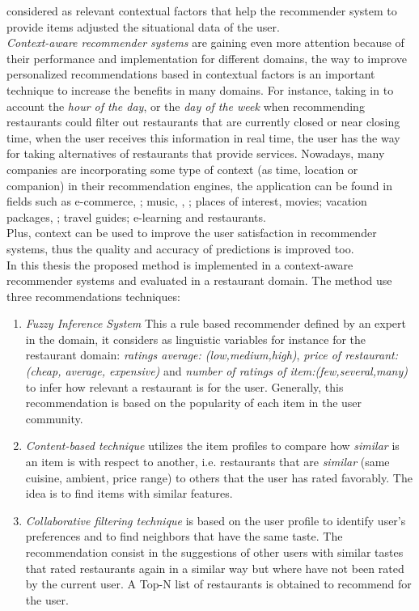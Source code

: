 considered as relevant contextual factors that help the recommender
system to provide items adjusted the situational data of the user.\\
\textit{Context-aware recommender systems} are gaining even more
attention because of their performance and implementation for
different domains, the  way to improve personalized recommendations
based in contextual factors is an important technique to increase the
benefits in  many domains. For instance, taking in to account the
\textit{hour of the day},  or the \textit{day of the week} when
recommending restaurants could  filter out restaurants that are
currently closed or near closing time, when the user receives this
information in real time, the user has the  way for taking
alternatives of restaurants that provide services. Nowadays, many
companies are incorporating some type of context (as time, location or
companion) in their recommendation engines,  the application can be
found in fields such as e-commerce\cite{schafer1999recommender},
\cite{bulander2005enabling}; music\cite{ricci2012context}, 
\cite{baltrunas2011incarmusic}, \cite{huq2010automated}; 
places of interest\cite{baltrunas2012context},
movies\cite{eyjolfsdottir2010moviegen}; vacation
packages\cite{liu2011personalized}, \cite{liu2014cocktail}; 
travel guides\cite{savage2012m}; e-learning\cite{ortigosa2010entornos} 
and restaurants\cite{chu2013chinese}.\\
Plus, context can be used to improve the user satisfaction  in
recommender systems, thus the quality and accuracy of predictions  
is improved too.\\
In this thesis the proposed method is implemented in a context-aware 
recommender systems and evaluated in a restaurant domain. The method 
use three recommendations techniques:
\begin{enumerate} 
\item \textit{Fuzzy Inference System} This a rule based recommender
defined by an expert in the domain, it considers as linguistic
variables for instance for the restaurant domain: \textit{ratings
average: (low,medium,high)}, \textit{price of restaurant:(cheap,
average, expensive)} and \textit{number of ratings of
item:(few,several,many)} to infer how relevant a restaurant is for the
user. Generally, this recommendation is based on the popularity of
each item in the user community.
\item \textit{Content-based technique} utilizes the item profiles 
to compare how \textit{similar} is an item is with respect to 
another, i.e. restaurants that are \textit{similar} (same cuisine, 
ambient, price range)  to others that the user has rated favorably. 
The idea is to find items with similar features. 
\item \textit{Collaborative filtering technique} is based on the user
profile to identify user's preferences and to find neighbors that
have the same taste. The recommendation consist in the suggestions of
other users with similar tastes that rated restaurants again in a
similar way but where have not been rated by the current user. A Top-N
list of restaurants is obtained to recommend for the user.
\end{enumerate} 

